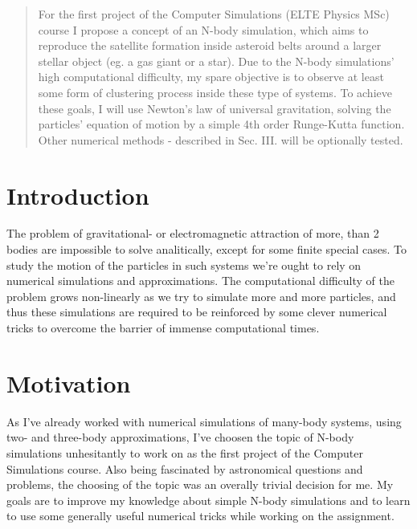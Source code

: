 \begin{abstract}
    \noindent For the first project of the Computer Simulations (ELTE Physics MSc) course I propose a concept of an N-body simulation, which aims to reproduce the satellite formation inside asteroid belts around a larger stellar object (eg. a gas giant or a star). Due to the N-body simulations' high computational difficulty, my spare objective is to observe at least some form of clustering process inside these type of systems. To achieve these goals, I will use Newton's law of universal gravitation, solving the particles' equation of motion by a simple 4th order Runge-Kutta function. Other numerical methods - described in Sec. III. will be optionally tested.
\end{abstract}

\begin{multicols}{2}
\section{Introduction}
The problem of gravitational- or electromagnetic attraction of more, than 2 bodies are impossible to solve analitically, except for some finite special cases. To study the motion of the particles in such systems we're ought to rely on numerical simulations and approximations. The computational difficulty of the problem grows non-linearly as we try to simulate more and more particles, and thus these simulations are required to be reinforced by some clever numerical tricks to overcome the barrier of immense computational times.

\section{Motivation}
As I've already worked with numerical simulations of many-body systems, using two- and three-body approximations, I've choosen the topic of N-body simulations unhesitantly to work on as the first project of the Computer Simulations course. Also being fascinated by astronomical questions and problems, the choosing of the topic was an overally trivial decision for me. My goals are to improve my knowledge about simple N-body simulations and to learn to use some generally useful numerical tricks while working on the assignment.


\end{multicols}
